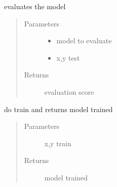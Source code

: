\documentclass[letterpaper,10pt,english]{sphinxmanual}
\begin{document}

\begin{fulllineitems}
\label{\detokenize{algorithms:algorithms.ird.ird_trainer.do_test}}
\sphinxAtStartPar
evaluates the model
\begin{quote}\begin{description}
\item[{Parameters}] \leavevmode\begin{itemize}
\item {} 
\sphinxAtStartPar
{} \textendash{} model to evaluate

\item {} 
\sphinxAtStartPar
{} \textendash{} x,y test

\end{itemize}

\item[{Returns}] \leavevmode
\sphinxAtStartPar
evaluation score

\end{description}\end{quote}

\end{fulllineitems}


\begin{fulllineitems}
\label{\detokenize{algorithms:algorithms.ird.ird_trainer.do_train}}
\sphinxAtStartPar
do train and returns model trained
\begin{quote}\begin{description}
\item[{Parameters}] \leavevmode
\sphinxAtStartPar
{} \textendash{} x,y train

\item[{Returns}] \leavevmode
\sphinxAtStartPar
model trained

\end{description}\end{quote}

\end{fulllineitems}
\end{document}
